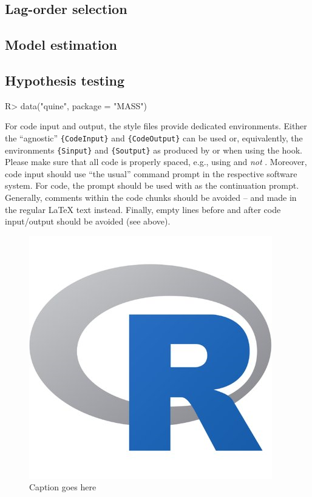 \documentclass[article]{jss}
\newcommand{\fct}[1]{\code{#1()}}
\begin{document}
\subsection{Lag-order selection}  \label{subsec:lags}


\subsection{Model estimation}  \label{subsec:estimation}


\subsection{Hypothesis testing} \label{subsec:testing}



%
\begin{CodeChunk}
\begin{CodeInput}
R> data("quine", package = "MASS")
\end{CodeInput}
\end{CodeChunk}
%


\begin{leftbar}
For code input and output, the style files provide dedicated environments.
Either the ``agnostic'' \verb|{CodeInput}| and \verb|{CodeOutput}| can be used
or, equivalently, the environments \verb|{Sinput}| and \verb|{Soutput}| as
produced by \fct{Sweave} or  when using the 
hook. Please make sure that all code is properly spaced, e.g., using
 and \emph{not} . Moreover, code input should
use ``the usual'' command prompt in the respective software system. For
 code, the prompt  should be used with  as
the continuation prompt. Generally, comments within the code chunks should be
avoided -- and made in the regular {\LaTeX} text instead. Finally, empty lines
before and after code input/output should be avoided (see above).
\end{leftbar}


\begin{figure}[h]
  \centering
  \includegraphics[scale = .6, keepaspectratio=true]{Figures/Rlogo.png}
  \caption{Caption goes here}
  \label{fig:Rlogo}
\end{figure}
\end{document}
